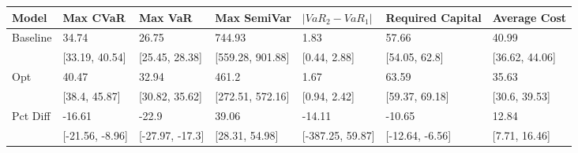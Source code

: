 \begin{tabular}{lllllll}
\toprule
   Model &        Max CVaR &         Max VaR &      Max SemiVar & $|VaR_2 - VaR_1|$ & Required Capital &   Average Cost \\
\midrule
Baseline &           34.74 &           26.75 &           744.93 &              1.83 &            57.66 &          40.99 \\
         &  [33.19, 40.54] &  [25.45, 28.38] & [559.28, 901.88] &      [0.44, 2.88] &    [54.05, 62.8] & [36.62, 44.06] \\
     Opt &           40.47 &           32.94 &            461.2 &              1.67 &            63.59 &          35.63 \\
         &   [38.4, 45.87] &  [30.82, 35.62] & [272.51, 572.16] &      [0.94, 2.42] &   [59.37, 69.18] &  [30.6, 39.53] \\
Pct Diff &          -16.61 &           -22.9 &            39.06 &            -14.11 &           -10.65 &          12.84 \\
         & [-21.56, -8.96] & [-27.97, -17.3] &   [28.31, 54.98] &  [-387.25, 59.87] &  [-12.64, -6.56] &  [7.71, 16.46] \\
\bottomrule
\end{tabular}
